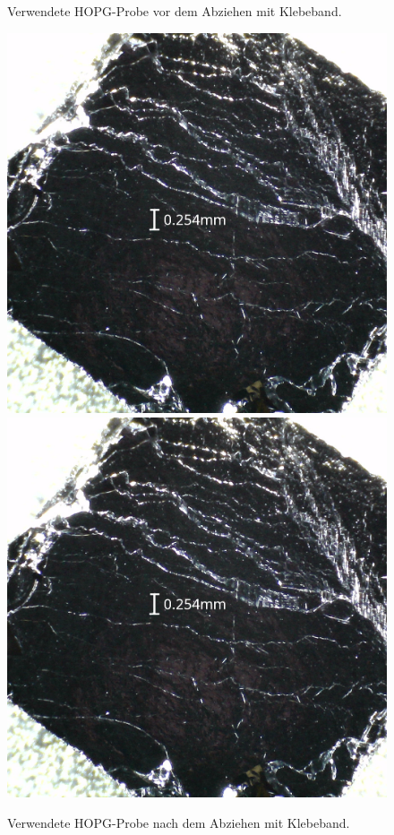 \documentclass{article}
\begin{document}
\begin{figure}[h]
\begin{minipage}{0.52\textwidth}
        \caption{Verwendete HOPG-Probe vor dem Abziehen mit Klebeband.}
        \label{fig:hopg-raw-lupe}
    \end{minipage}
    \hfill
    \begin{minipage}{0.46\textwidth}
        \centering
        \includegraphics[width=\textwidth]{HOPGnach}
        \includegraphics[width=\textwidth]{HOPGnach}
        \caption{Verwendete HOPG-Probe nach dem Abziehen mit Klebeband.}
        \label{fig:hopg-nach-lupe}
    \end{minipage}
\end{figure}
\end{document}
